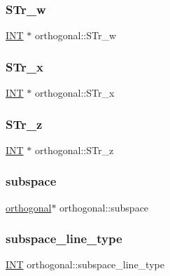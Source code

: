 \subsubsection{\texorpdfstring{S\+Tr\+\_\+w}{STr\_w}}
{\footnotesize\ttfamily \mbox{\hyperlink{galois_8h_a09fddde158a3a20bd2dcadb609de11dc}{I\+NT}} $\ast$ orthogonal\+::\+S\+Tr\+\_\+w}

\mbox{\label{classorthogonal_ac82a4f479d1f4d65865c7cc9d7cf156a}} 
\subsubsection{\texorpdfstring{S\+Tr\+\_\+x}{STr\_x}}
{\footnotesize\ttfamily \mbox{\hyperlink{galois_8h_a09fddde158a3a20bd2dcadb609de11dc}{I\+NT}} $\ast$ orthogonal\+::\+S\+Tr\+\_\+x}

\mbox{\label{classorthogonal_ad27967ed5bcdd1b64c070a5b39d5deb9}} 
\subsubsection{\texorpdfstring{S\+Tr\+\_\+z}{STr\_z}}
{\footnotesize\ttfamily \mbox{\hyperlink{galois_8h_a09fddde158a3a20bd2dcadb609de11dc}{I\+NT}} $\ast$ orthogonal\+::\+S\+Tr\+\_\+z}

\mbox{\label{classorthogonal_a6fa6e56ab6db63da20bb033fa8dce16e}} 
\subsubsection{\texorpdfstring{subspace}{subspace}}
{\footnotesize\ttfamily \mbox{\hyperlink{classorthogonal}{orthogonal}}$\ast$ orthogonal\+::subspace}

\mbox{\label{classorthogonal_aac6d80f88de58530183821a40b733ffa}} 
\subsubsection{\texorpdfstring{subspace\+\_\+line\+\_\+type}{subspace\_line\_type}}
{\footnotesize\ttfamily \mbox{\hyperlink{galois_8h_a09fddde158a3a20bd2dcadb609de11dc}{I\+NT}} orthogonal\+::subspace\+\_\+line\+\_\+type}

